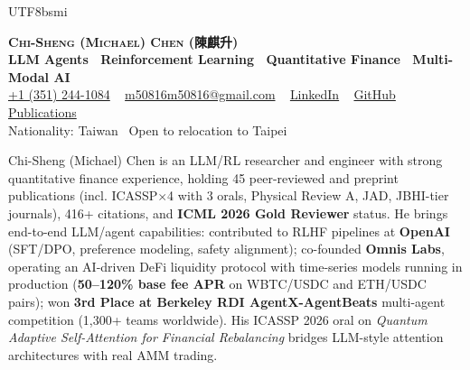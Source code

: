 \documentclass[letterpaper,10pt]{article}
\begin{document}
\begin{CJK*}{UTF8}{bsmi}
\begin{center}
    \textbf{\Huge \scshape Chi-Sheng (Michael) Chen (陳麒升)} \\ \vspace{3pt}
    \small \textbf{LLM Agents \textbar \ Reinforcement Learning \textbar \ Quantitative Finance \textbar \ Multi-Modal AI} \\ \vspace{3pt}
    \small
    \faMobile \hspace{.5pt} \href{tel:+13512441084}{+1 (351) 244-1084}
    \textbar \
    \faAt \hspace{.5pt} \href{mailto:m50816m50816@gmail.com}{m50816m50816@gmail.com}
    \textbar \
    \faLinkedinSquare \hspace{.5pt} \href{https://www.linkedin.com/in/michael-chi-sheng-chen-257359137}{LinkedIn}
    \textbar \
    \faGithub \hspace{.5pt} \href{https://github.com/ChiShengChen}{GitHub}
    \textbar \
    \faGlobe \hspace{.5pt} \href{https://scholar.google.com.tw/citations?user=5XHD7nkAAAAJ&hl=zh-TW}{Publications} \\
    \small Nationality: Taiwan \textbar \ Open to relocation to Taipei \\ \vspace{3pt}
\end{center}
\end{CJK*}

Chi-Sheng (Michael) Chen is an LLM/RL researcher and engineer with strong quantitative finance experience, holding 45 peer-reviewed and preprint publications (incl. ICASSP$\times$4 with 3 orals, Physical Review A, JAD, JBHI-tier journals), 416+ citations, and \textbf{ICML 2026 Gold Reviewer} status. He brings end-to-end LLM/agent capabilities: contributed to RLHF pipelines at \textbf{OpenAI} (SFT/DPO, preference modeling, safety alignment); co-founded \textbf{Omnis Labs}, operating an AI-driven DeFi liquidity protocol with time-series models running in production (\textbf{50--120\% base fee APR} on WBTC/USDC and ETH/USDC pairs); won \textbf{3rd Place at Berkeley RDI AgentX-AgentBeats} multi-agent competition (1,300+ teams worldwide). His ICASSP 2026 oral on \emph{Quantum Adaptive Self-Attention for Financial Rebalancing} bridges LLM-style attention architectures with real AMM trading.

\end{document}
